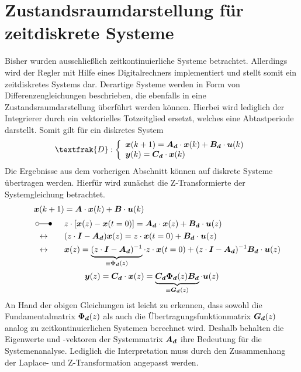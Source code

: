 \section{Zustandsraumdarstellung für zeitdiskrete Systeme}
Bisher wurden ausschließlich zeitkontinuierliche Systeme betrachtet. Allerdings wird der Regler mit Hilfe eines Digitalrechners implementiert und stellt somit ein zeitdiskretes Systems dar. Derartige Systeme werden in Form von Differenzengleichungen beschrieben, die ebenfalls in eine Zustandsraumdarstellung überführt werden können. Hierbei wird lediglich der Integrierer durch ein vektorielles Totzeitglied ersetzt, welches eine Abtastperiode darstellt. Somit gilt für ein diskretes System 
\begin{equation}
\textfrak{D} : \left\{ \begin{array}{ll}
\bs{{x}}(k+1) = \bs{A_d}\cdot \bs{x}(k) + \bs{B_d}\cdot \bs{u}(k) \\
\bs{y}(k) = \bs{C_d}\cdot \bs{x}(k)
\end{array}
\right.
\label{eq_discrete_ss}
\end{equation}
Die Ergebnisse aus dem vorherigen Abschnitt können auf diskrete Systeme übertragen werden. Hierfür wird zunächst die Z-Transformierte der Systemgleichung betrachtet.
\begin{align}
\bs{x}(k+1) &= \bs{A}\cdot \bs{x}(k)+\bs{B}\cdot \bs{u}(k)
\nonumber
\\ \myLaplace  &z\cdot \left[\bs{x}(z)- \bs{x}(t=0)\right] = \bs{A_d}\cdot \bs{x}(z) + \bs{B_d}\cdot \bs{u}(z) \nonumber
\\
\hspace{15pt}\leftrightarrow\hspace{20pt}
&(z\cdot\bs{I}-\bs{A_d})\bs{x}(z) = z\cdot \bs{x}(t=0)+\bs{B_d}\cdot \bs{u}(z) \nonumber
\\
\hspace{15pt}\leftrightarrow\hspace{20pt}
&\bs{x}(z) = \underbrace{(z\cdot\bs{I}-\bs{A_d})^{-1}}_{\equiv \bs{\Phi_d}(z)}\cdot z\cdot \bs{x}(t=0) + (z\cdot \bs{I}-\bs{A_d})^{-1}\bs{B_d}\cdot \bs{u}(z)
\end{align}
\begin{equation}
\boldsymbol{y}(z) = \boldsymbol{C_d}\cdot \boldsymbol{x}(z) = \underbrace{\boldsymbol{C_d}\boldsymbol{\Phi_d}(z)\boldsymbol{B_d}}_{\equiv \boldsymbol{G_d}(z)}\cdot \boldsymbol{u}(z)
\end{equation}
An Hand der obigen Gleichungen ist leicht zu erkennen, dass sowohl die Fundamentalmatrix $\boldsymbol{\Phi_d}(z)$ als auch die Übertragungsfunktionmatrix $\boldsymbol{G_d}(z)$ analog zu zeitkontinuierlichen Systemen berechnet wird. Deshalb behalten die Eigenwerte und -vektoren der Systemmatrix $\boldsymbol{A_d}$ ihre Bedeutung für die Systemenanalyse. Lediglich die Interpretation muss durch den Zusammenhang der Laplace- und Z-Transformation angepasst werden.
